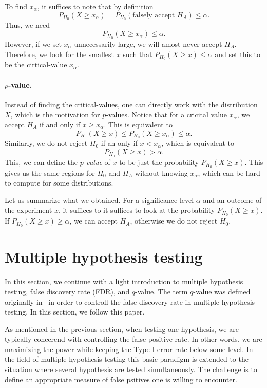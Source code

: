 To find $x_\alpha$, it suffices to note that by definition
$$P_{H_0}(X\geq x_\alpha) = P_{H_0}(\text{falsely accept $H_A$}) \leq \alpha.$$
Thus, we need
$$P_{H_0}(X\geq x_\alpha) \leq \alpha.$$
However, if we set $x_\alpha$ unnecessarily large, we will amost never accept $H_A$.
Therefore, we look for the smallest $x$ such that $P_{H_0}(X \geq x) \leq \alpha$ and set this to be the cirtical-value $x_\alpha$.


\paragraph{$p$-value.}
Instead of finding the critical-values, one can directly work with the distribution $X$, which is the motivation for $p$-values.
Notice that for a cricital value $x_\alpha$, we accept $H_A$ if and only if $x\geq x_\alpha$.
This is equivalent to
$$P_{H_0}(X\geq x) \leq P_{H_0}(X\geq x_\alpha)\leq\alpha.$$
Similarly, we do not reject $H_0$ if an only if $x < x_\alpha$, which is equivalent to
$$P_{H_0}(X\geq x) > \alpha.$$
This, we can define the \emph{$p$-value} of $x$ to be just the probability $P_{H_0}(X\geq x)$.
This gives us the same regions for $H_0$ and $H_A$ without knowing $x_\alpha$, which can be hard to compute for some distributions.

Let us summarize what we obtained.
For a significance level $\alpha$ and an outcome of the experiment $x$, it suffices to it suffices to look at the probability $P_{H_0}(X\geq x)$.
If $P_{H_0}(X\geq x) \geq \alpha$, we can accept $H_A$, otherwise we do not reject $H_0$.



\section{Multiple hypothesis testing}
\label{qvalue}

In this section, we continue with a light introduction to multiple hypothesis testing, false discovery rate (FDR), and $q$-value.
The term $q$-value was defined originally in~\cite{storey2003positive} in order to controll the false discovery rate in multiple hypothesis testing.
In this section, we follow this paper.

As mentioned in the previous section, when testing one hypothesis, we are typically concerend with controlling the false positive rate.
In other words, we are maximizing the power while keeping the Type-I error rate below some level.
In the field of multiple hypothesis testing this basic paradigm is extended to the situation where several hypothesis are tested simultaneously.
The challenge is to define an appropriate measure of false psitives one is willing to encounter.


